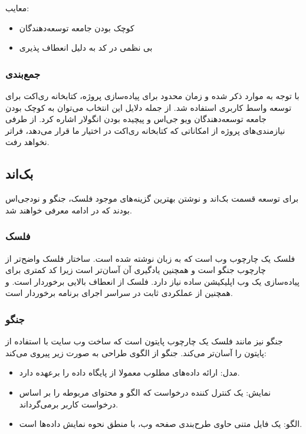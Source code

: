 معایب:

\begin{itemize}
    \item کوچک بودن جامعه توسعه‌دهندگان
    \item بی نظمی در کد به دلیل انعطاف پذیری 
\end{itemize}


\subsubsection{جمع‌بندی}

با توجه به موارد ذکر شده و زمان محدود برای پیاده‌سازی پروژه، کتابخانه ری‌اکت برای توسعه واسط کاربری استفاده شد. از جمله دلایل این انتخاب می‌توان به کوچک بودن جامعه توسعه‌دهندگان ویو جی‌اس و پیچیده بودن انگولار اشاره کرد. از طرفی نیازمندی‌های پروژه از امکاناتی که کتابخانه ری‌اکت در اختیار ما قرار می‌دهد، فراتر نخواهد رفت.


\subsection{بک‌اند}
برای توسعه قسمت بک‌اند و نوشتن  بهترین گزینه‌های موجود فلسک، جنگو و نودجی‌اس بودند که در ادامه معرفی خواهند شد.

\subsubsection{فلسک}
فلسک یک چارچوب وب است که به زبان  نوشته شده است. ساختار فلسک واضح‌تر از چارچوب جنگو است و همچنین یادگیری آن آسان‌تر است زیرا کد کمتری برای پیاده‌سازی یک وب اپلیکیشن ساده نیاز دارد. فلسک از انعطاف بالایی برخوردار است. و همچنین از عملکردی ثابت در سراسر اجرای برنامه برخوردار است.

\subsubsection{جنگو }

جنگو نیز مانند فلسک یک چارچوب پایتون است که ساخت وب سایت با استفاده از پایتون را آسان‌تر می‌کند. جنگو از الگوی طراحی  به صورت زیر پیروی می‌کند:

\begin{itemize}
    \item مدل: ارائه داده‌های مطلوب معمولا از پایگاه داده را برعهده دارد.
    \item نمایش: یک کنترل کننده درخواست که الگو و محتوای مربوطه را بر اساس درخواست کاربر برمی‌گرداند.
    \item الگو: یک فایل متنی حاوی طرح‌بندی صفحه وب، با منطق نحوه نمایش داده‌ها است.
\end{itemize}


